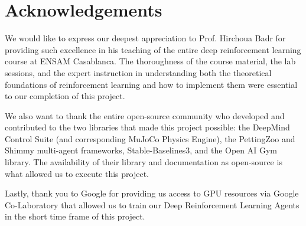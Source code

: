 \chapter*{\center \Large  Acknowledgements}

We would like to express our deepest appreciation to Prof. Hirchoua Badr for providing such excellence in his teaching of the entire deep reinforcement learning course at ENSAM Casablanca. The thoroughness of the course \href{}{}material, the lab sessions, and the expert instruction in understanding both the theoretical foundations of reinforcement learning and how to implement them were essential to our completion of this project.

We also want to thank the entire open-source community who developed and contributed to the two libraries that made this project possible: the DeepMind Control Suite (and corresponding MuJoCo Physics Engine), the PettingZoo and Shimmy multi-agent frameworks, Stable-Baselines3, and the Open AI Gym library. The availability of their library and documentation as open-source is what allowed us to execute this project.

Lastly, thank you to Google for providing us access to GPU resources via Google Co-Laboratory that allowed us to train our Deep Reinforcement Learning Agents in the short time frame of this project.
